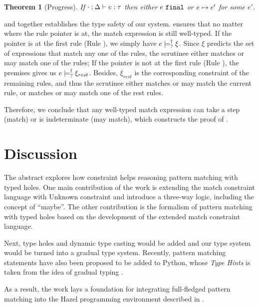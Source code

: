 \documentclass[acmsmall,screen,review,nonacm]{acmart}
\theoremstyle{slplain}
\newtheorem{thm}{Theorem}  %
\numberwithin{thm}{section}
\begin{document}
\begin{thm}[Progress]
 \label{thrm:progress}
 If $\cdot \mathbin{;} \Delta \vdash e : \tau$ then either $e ~\mathtt{final}$ or $e \mapsto e'$ for some $e'$.
\end{thm}

 and  together establishes the type safety of our system.
 ensures that no matter where the rule pointer is at, the match expression is still well-typed.
If the pointer is at the first rule (Rule \TMatchZPre), we simply have $e \models_{?}^{\dag} \xi$. Since $\xi$ predicts the set of expressions that match any one of the rules, the scrutinee either matches or may match one of the rules;
If the pointer is not at the first rule (Rule \TMatchNZPre), the premises gives us $e \models_{?}^{\dag} \xi_{rest}$. Besides, $\xi_{rest}$ is the corresponding constraint of the remaining rules, and thus the scrutinee either matches or may match the current rule, or matches or may match one of the rest rules.

Therefore, we conclude that any well-typed match expression can take a step (match) or is indeterminate (may match), which constructs the proof of .

\section{Discussion}
The abstract explores how constraint helps reasoning pattern matching with typed holes.
One main contribution of the work is extending the match constraint language \cite{Harper2012} with Unknown constraint and introduce a three-way logic, including the concept of ``maybe''. The other contribution is the formalism of pattern matching with typed holes based on the development of the extended match constraint language.

Next, type holes and dynamic type casting would be added and our type system would be turned into a gradual type system.
Recently, pattern matching statements have also been proposed to be added to \textsf{Python}, whose \emph{Type Hints} is taken from the idea of gradual typing \cite{pep484,pep622,Siek2006}.

As a result, the work lays a foundation for integrating full-fledged pattern matching into the \textsf{Hazel} programming environment described in \citet{DBLP:journals/pacmpl/OmarVCH19}.

\clearpage



\end{document}
